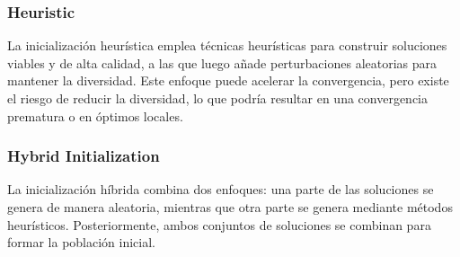 \documentclass[12pt]{article}
\begin{document}
            \subsubsection[Heuristic]{Heuristic}
                La inicialización heurística emplea técnicas heurísticas para construir soluciones viables y de alta calidad, a las que luego añade perturbaciones aleatorias para mantener la diversidad. Este enfoque puede acelerar la convergencia, pero existe el riesgo de reducir la diversidad, lo que podría resultar en una convergencia prematura o en óptimos locales.
            \subsubsection[Hybrid Initialization]{Hybrid Initialization}
                La inicialización híbrida combina dos enfoques: una parte de las soluciones se genera de manera aleatoria, mientras que otra parte se genera mediante métodos heurísticos. Posteriormente, ambos conjuntos de soluciones se combinan para formar la población inicial.
                
\end{document}
